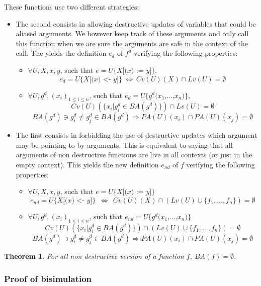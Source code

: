 \documentclass[12pt,a4paper]{article}
\newcommand{\cl}[1]{\texttt{#1}}
\newtheorem{theorem}{Theorem}
\newcommand{\ucont}[1]{\{#1\}}
\begin{document}
These functions use two different strategies:
\begin{itemize}
\item The second consists in allowing destructive updates of variables that could be aliased arguments. We however keep track of these arguments and only call this function when we are sure the arguments are safe in the context of the call. 
The yields the definition $e_d$ of $f^d$ verifying the following properties:
\begin{itemize}
\item $\forall U, X, x, y$, such that $e = U\ucont{X\cl{[(}x \cl{) := } y \cl{]}}$,
$$ e_d = U\ucont{X\cl{[(}x \cl{) <- } y \cl{]}} \ \Longleftrightarrow \ Cv(U)(X) \cap Lv(U) = \emptyset $$
\item $\forall U, g^d, (x_i)_{1 \leq i \leq n}$, such that $e_d = U\ucont{g^d\cl{(}x_1 \cl{,} ... \cl{,} x_n \cl{)}}$,
$$ Cv(U)( \{ x_i | g^d_i \in BA(g^d) \}) \cap Lv(U) = \emptyset $$
$$ BA(g^d) \ni g^d_i \neq g^d_j \in BA(g^d) \Longrightarrow PA(U)(x_i) \cap PA(U)(x_j) = \emptyset$$
\end{itemize}
\item The first consists in forbidding the use of destructive updates which argument may be pointing to by arguments. This is equivalent to saying that all arguments of non destructive functions are live in all contexts (or just in the empty context).
This yields the new definition $e_{nd}$ of $f$ verifying the following properties:
\begin{itemize}
\item $\forall U, X, x, y$, such that $e = U\ucont{X\cl{[(}x \cl{) := } y \cl{]}}$
$$ e_{nd} = U\ucont{X\cl{[(}x \cl{) <- } y \cl{]}} \ \ \Longleftrightarrow \ \  Cv(U)(X) \cap \left( Lv(U) \cup \{f_1, ... , f_n \} \right) = \emptyset $$
\item $\forall U, g^d, (x_i)_{1 \leq i \leq n}$, such that $e_{nd} = U\ucont{g^d\cl{(}x_1 \cl{,} ... \cl{,} x_n \cl{)}}$
$$ Cv(U)( \{ x_i | g^d_i \in BA(g^d) \}) \cap \left( Lv(U) \cup \{f_1, ... , f_n \} \right) = \emptyset $$
$$ BA(g^d) \ni g^d_i \neq g^d_j \in BA(g^d) \Longrightarrow PA(U)(x_i) \cap PA(U)(x_j) = \emptyset$$
\end{itemize}
\end{itemize}
\begin{theorem}
For all non destructive version of a function $f$, $ BA(f) = \emptyset$.
\end{theorem}

\subsubsection{Proof of bisimulation}
\end{document}
